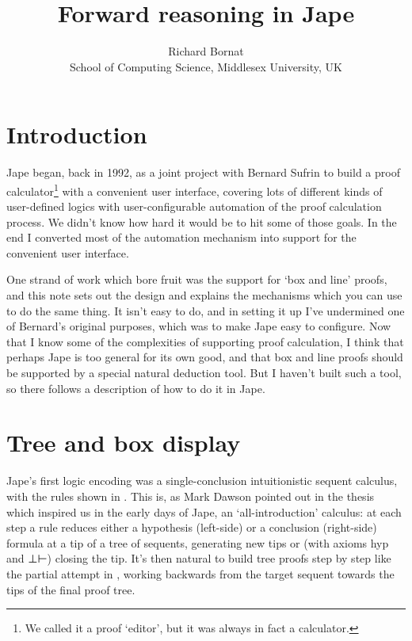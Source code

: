 \documentclass[11pt]{article}
\title{Forward reasoning in Jape}
\author{Richard Bornat \\ School of Computing Science, Middlesex University, UK
}
\begin{document}
\maketitle

\begin{abstract}
\noindent

\end{abstract}

\section{Introduction}

Jape began, back in 1992, as a joint project with Bernard Sufrin to build a proof calculator\footnote{We called it a proof `editor', but it was always in fact a calculator.} with a convenient user interface, covering lots of different kinds of user-defined logics with user-configurable automation of the proof calculation process. We didn't know how hard it would be to hit some of those goals. In the end I converted most of the automation mechanism into support for the convenient user interface.

One strand of work which bore fruit was the support for `box and line' proofs, and this note sets out the design and explains the mechanisms which you can use to do the same thing. It isn't easy to do, and in setting it up I've undermined one of Bernard's original purposes, which was to make Jape easy to configure. Now that I know some of the complexities of supporting proof calculation, I think that perhaps Jape is too general for its own good, and that box and line proofs should be supported by a special natural deduction tool. But I haven't built such a tool, so there follows a description of how to do it in Jape.

\section{Tree and box display}

Jape's first logic encoding was a single-conclusion intuitionistic sequent calculus, with the rules shown in . This is, as Mark Dawson pointed out in the thesis~\cite{Dawsonthesis} which inspired us in the early days of Jape, an `all-introduction' calculus: at each step a rule reduces either a hypothesis (left-side) or a conclusion (right-side) formula at a tip of a tree of sequents, generating new tips or (with axioms hyp and ⊥⊢) closing the tip. It's then natural to build tree proofs step by step like the partial attempt in , working backwards from the target sequent towards the tips of the final proof tree.
\end{document}
